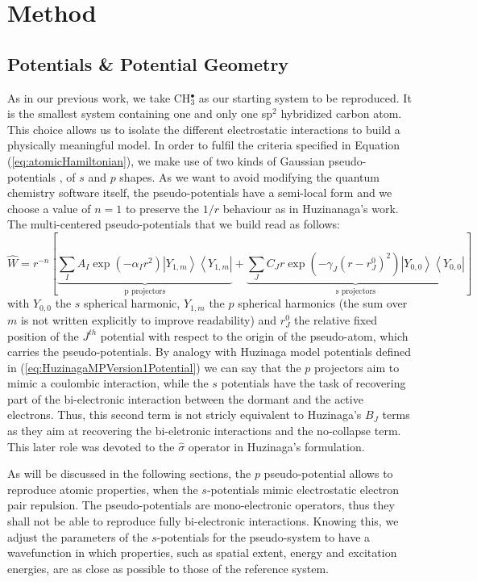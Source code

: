 \documentclass[journal=jctcce,manuscript=article]{achemso}
\begin{document}
\section{Method}

\subsection{Potentials \& Potential Geometry}

As in our previous work\cite{drujon_pseudopotentials_2013},
we take CH\(^{\bullet}_{3}\) as our starting system to be reproduced.
It is the smallest system containing one and only one sp$^2$ hybridized carbon atom.
This choice allows us to isolate the different electrostatic interactions
to build a physically meaningful model.
In order to fulfil the criteria specified in Equation (\ref{eq:atomicHamiltonian}),
we make use of two kinds of Gaussian pseudo-potentials \cite{me_structure_theory}, of \(s\) and \(p\) shapes. As we want to avoid modifying the quantum chemistry software itself, the pseudo-potentials have a semi-local form and we choose a value of \(n = 1\) to preserve the \(1/r\) behaviour as in Huzinanaga's work.
The multi-centered pseudo-potentials that we build read as follows:
\begin{equation}
\label{eq:ourPP}
\hat{W} = r^{-n}\left[%
\underbrace{\sum_IA_I\exp(-\alpha_I r^2)\left|Y_{1,m}\right>\left<Y_{1,m}\right|}_{\text{p projectors}}%
+%
\underbrace{\sum_JC_Jr\exp(-\gamma_J (r-r^0_J)^2)\left|Y_{0,0}\right>\left<Y_{0,0}\right|}_{\text{s projectors}}%
\right]
\end{equation}
with $Y_{0,0}$ the $s$ spherical harmonic, $Y_{1,m}$ the $p$ spherical harmonics (the sum over $m$
is not written explicitly to improve readability) and $r^0_J$ the relative fixed position of the $J^{th}$
potential with respect to the origin of the pseudo-atom, which carries the pseudo-potentials.
By analogy with Huzinaga model potentials defined in (\ref{eq:HuzinagaMPVersion1Potential})
we can say that the $p$ projectors aim to mimic a coulombic interaction,
while the $s$ potentials have the task of recovering part of the bi-electronic interaction
between the dormant and the active electrons.
Thus, this second term is not stricly equivalent to Huzinaga's $B_J$ terms as they aim at recovering
the bi-eletronic interactions and the no-collapse term.
This later role was devoted to the $\hat{\sigma}$ operator in Huzinaga's formulation.

As will be discussed in the following sections,
the \(p\) pseudo-potential allows to reproduce atomic properties, when the
\(s\)-potentials mimic electrostatic electron pair repulsion. The pseudo-potentials are mono-electronic operators, thus they shall not be able to reproduce fully bi-electronic interactions. Knowing this, we adjust the parameters of the \(s\)-potentials for the pseudo-system to have a wavefunction in which properties, such as spatial extent, energy and excitation energies, are as close as possible to those of the reference system.
\end{document}
